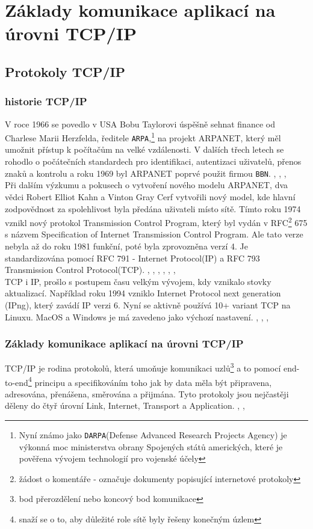 \documentclass[12pt]{report}			%
\begin{document}
	
	\part{Základy komunikace aplikací na úrovni TCP/IP}
	
		\chapter{Protokoly TCP/IP}
			
			\section{historie TCP/IP}
				V roce 1966 se povedlo v USA Bobu Taylorovi úspěšně sehnat finance od Charlese Marii Herzfelda, ředitele \texttt{ARPA},\footnote{Nyní známo jako \texttt{DARPA}(Defense Advanced Research Projects Agency) je výkonná moc ministerstva obrany Spojených států amerických, které je pověřena vývojem technologií pro vojenské účely} na projekt ARPANET, který měl umožnit přístup k počítačům na velké vzdálenosti. V dalších třech letech se rohodlo o počátečních standardech pro identifikaci, autentizaci uživatelů, přenos znaků a kontrolu a roku 1969 byl ARPANET poprvé použit firmou \texttt{BBN}. \cite{History}, \cite{History3}, \cite{History2}, \cite{ARPNET} \\
Při dalším výzkumu a pokusech o vytvoření nového modelu ARPANET, dva vědci Robert Elliot Kahn a Vinton Gray Cerf vytvořili nový model, kde hlavní zodpovědnost za spolehlivost byla předána uživateli místo sítě. Tímto roku 1974 vznikl nový protokol Transmission Control Program, který byl vydán v RFC\footnote{žádost o komentáře - označuje dokumenty popisující internetové protokoly} 675 s názvem Specification of Internet Transmission Control Program. Ale tato verze nebyla až do roku 1981 funkční, poté byla zprovozněna verzí 4. Je standardizována pomocí RFC 791 - Internet Protocol(IP) a RFC 793 Transmission Control Protocol(TCP). \cite{History}, \cite{History3}, \cite{History2}, \cite{ARPNET}, \cite{IP}, \cite{TCP}, \cite{Rules}
\\
TCP i IP, prošlo s postupem času velkým vývojem, kdy vznikalo stovky aktualizací. Například roku 1994 vzniklo Internet Protocol next generation (IPng), který zavádí IP verzi 6. Nyní se aktivně používá 10+ variant TCP na Linuxu. MacOS a Windows je má zavedeno jako výchozí nastavení. \cite{History3}, \cite{History2}, \cite{History}, \cite{IP}   

			\section{Základy komunikace aplikací na úrovni TCP/IP }
			TCP/IP je rodina protokolů, která umoňuje komunikaci uzlů\footnote{bod přerozdělení nebo koncový bod komunikace} a to pomocí end-to-end\footnote{snaží se o to, aby důležité role sítě byly řešeny konečným úzlem} principu a specifikováním toho jak by data měla být připravena, adresována, přenášena, směrována a přijmána. Tyto protokoly jsou nejčastěji děleny do čtyř úrovní Link, Internet, Transport a Application. \cite{zakladykomunikace1}, \cite{zakladykomunikace2}, \cite{zakladykomunikace3}
			
\end{document}
